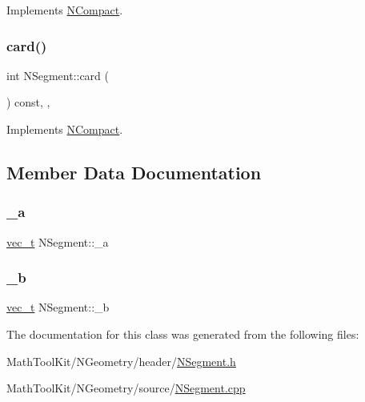 Implements \mbox{\hyperlink{class_n_compact_a574764d7ac4fe2393a739b67bf57a7f1}{N\+Compact}}.

\mbox{\label{class_n_segment_a2fbe9d64e08f8aaa60d09ba8fe0ca2ba}} 
\subsubsection{\texorpdfstring{card()}{card()}}
{\footnotesize\ttfamily int N\+Segment\+::card (\begin{DoxyParamCaption}{ }\end{DoxyParamCaption}) const\hspace{0.3cm}{\ttfamily [override]}, {\ttfamily [protected]}, {\ttfamily [virtual]}}



Implements \mbox{\hyperlink{class_n_compact_a816bb4976567a7bfed57763ce717b685}{N\+Compact}}.



\subsection{Member Data Documentation}
\mbox{\label{class_n_segment_ae97f9d86f36042b6d90f202c266c5fa2}} 
\subsubsection{\texorpdfstring{\_a}{\_a}}
{\footnotesize\ttfamily \mbox{\hyperlink{group___n_algebra_ga0a2cfc67e738a3d73e4f12098c4c07f6}{vec\+\_\+t}} N\+Segment\+::\+\_\+a\hspace{0.3cm}{\ttfamily [protected]}}

\mbox{\label{class_n_segment_a46d4842dffd0446c07a92704dd527096}} 
\subsubsection{\texorpdfstring{\_b}{\_b}}
{\footnotesize\ttfamily \mbox{\hyperlink{group___n_algebra_ga0a2cfc67e738a3d73e4f12098c4c07f6}{vec\+\_\+t}} N\+Segment\+::\+\_\+b\hspace{0.3cm}{\ttfamily [protected]}}



The documentation for this class was generated from the following files\+:\begin{DoxyCompactItemize}
\item 
Math\+Tool\+Kit/\+N\+Geometry/header/\mbox{\hyperlink{_n_segment_8h}{N\+Segment.\+h}}\item 
Math\+Tool\+Kit/\+N\+Geometry/source/\mbox{\hyperlink{_n_segment_8cpp}{N\+Segment.\+cpp}}\end{DoxyCompactItemize}

